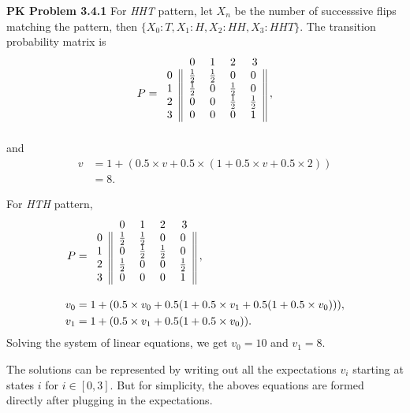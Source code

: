 \documentclass{article}
\begin{document}
\textbf{PK Problem 3.4.1}
For \emph{HHT} pattern, let $X_n$ be the number of successsive flips matching the pattern, then $\{X_0: T, X_1: H, X_2: HH, X_3: HHT\}$. 
The transition probability matrix is
\begin{align}
    P & = 
    \begin{blockarray}{ccccc}
        & 0 & 1 & 2 & 3 \\
        \begin{block}{c||cccc||}
          0 & \frac{1}{2} & \frac{1}{2} & 0 & 0  \\
          1 & \frac{1}{2} & 0 & \frac{1}{2} & 0  \\
          2 & 0 & 0 & \frac{1}{2} & \frac{1}{2}  \\
          3 & 0 & 0 & 0 & 1 \\
        \end{block}
    \end{blockarray}\; , \nonumber \\
\end{align}
and
\begin{align}
    v & = 1 + (0.5\times v + 0.5\times (1 + 0.5\times v + 0.5\times 2)) \nonumber \\
    & = 8. \nonumber
\end{align}

For \emph{HTH} pattern,
\begin{align}
    P & = 
    \begin{blockarray}{ccccc}
        & 0 & 1 & 2 & 3 \\
        \begin{block}{c||cccc||}
          0 & \frac{1}{2} & \frac{1}{2} & 0 & 0  \\
          1 & 0 & \frac{1}{2} & \frac{1}{2} & 0  \\
          2 & \frac{1}{2} & 0 & 0 & \frac{1}{2}  \\
          3 & 0 & 0 & 0 & 1 \\
        \end{block}
    \end{blockarray}\; , \nonumber \\
    v_0 & = 1 + (0.5\times v_0 + 0.5(1 + 0.5\times v_1 + 0.5(1 + 0.5\times v_0))), \nonumber \\
    v_1 & = 1 + (0.5\times v_1 + 0.5(1 + 0.5\times v_0)). \nonumber
\end{align}
Solving the system of linear equations, we get $v_0 = 10$ and $v_1 = 8$.

The solutions can be represented by writing out all the expectations $v_i$ starting at states $i$ for $i\in[0,3]$. 
But for simplicity, the aboves equations are formed directly after plugging in the expectations.
\end{document}
